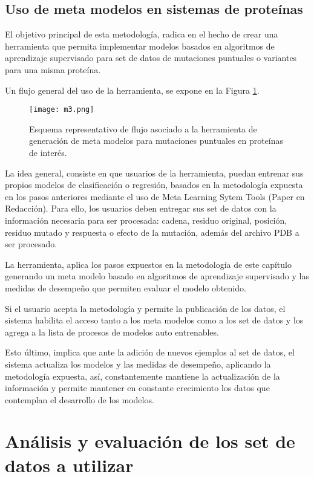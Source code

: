 \subsection{Uso de meta modelos en sistemas de proteínas}

El objetivo principal de esta metodología, radica en el hecho de crear una herramienta que permita implementar modelos basados en algoritmos de aprendizaje supervisado para set de datos de mutaciones puntuales o variantes para una misma proteína. 

Un flujo general del uso de la herramienta, se expone en la Figura \ref{C2:M3}.

\begin{figure}[!h]
	\centering
	\texttt{[image: m3.png]}
	\caption{Esquema representativo de flujo asociado a la herramienta de generación de meta modelos para mutaciones puntuales en proteínas de interés.}
	\label{C2:M3}
\end{figure}

La idea general, consiste en que usuarios de la herramienta, puedan entrenar sus propios modelos de clasificación o regresión, basados en la metodología expuesta en los pasos anteriores mediante el uso de Meta Learning Sytem Tools (Paper en Redacción). Para ello, los usuarios deben entregar sus set de datos con la información necesaria para ser procesada: cadena, residuo original, posición, residuo mutado y respuesta o efecto de la mutación, además del archivo PDB a ser procesado. 

La herramienta, aplica los pasos expuestos en la metodología de este capítulo generando un meta modelo basado en algoritmos de aprendizaje supervisado y las medidas de desempeño que permiten evaluar el modelo obtenido. 

Si el usuario acepta la metodología y permite la publicación de los datos, el sistema habilita el acceso tanto a los meta modelos como a los set de datos y los agrega a la lista de procesos de modelos auto entrenables.

Esto último, implica que ante la adición de nuevos ejemplos al set de datos, el sistema actualiza los modelos y las medidas de desempeño, aplicando la metodología expuesta, así, constantemente mantiene la actualización de la información y permite mantener en constante crecimiento los datos que contemplan el desarrollo de los modelos.

\section{Análisis y evaluación de los set de datos a utilizar}

